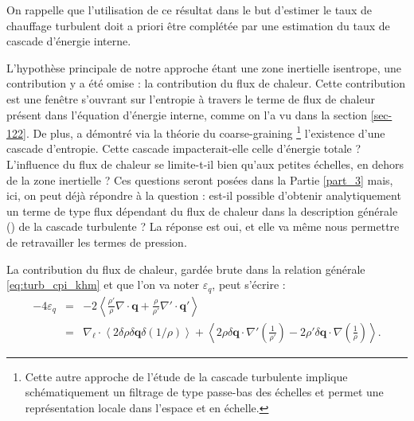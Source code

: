 On rappelle que l'utilisation de ce résultat dans le but d'estimer le taux de chauffage turbulent doit a priori être complétée par une estimation du taux de cascade d'énergie interne.

L'hypothèse principale de notre approche étant une zone inertielle isentrope, une contribution y a été omise : la contribution du flux de chaleur. Cette contribution est une fenêtre s'ouvrant sur l'entropie à travers le terme de flux de chaleur présent dans l'équation d'énergie interne, comme on l'a vu dans la section \ref{sec-122}. De plus, \cite{eyink_cascades_2018} a démontré via la théorie du \og coarse-graining \fg{}\footnote{Cette autre approche de l'étude de la cascade turbulente implique schématiquement un filtrage de type passe-bas des échelles et permet une représentation locale dans l'espace et en échelle.} l'existence d'une cascade d'entropie. Cette cascade impacterait-elle celle d'énergie totale ? L'influence du flux de chaleur se limite-t-il bien qu'aux petites échelles, en dehors de la zone inertielle ? Ces questions seront posées dans la Partie \ref{part_3} mais, ici, on peut déjà répondre à la question : est-il possible d'obtenir analytiquement un terme de type flux dépendant du flux de chaleur dans la description générale () de la cascade turbulente ? La réponse est oui, et elle va même nous permettre de retravailler les termes de pression. 

La contribution du flux de chaleur, gardée brute dans la relation  générale \eqref{eq:turb_cpi_khm} et que l'on va noter $\varepsilon_{q}$, peut s'écrire :
    \begin{eqnarray}
    \label{eq:turb_ref_q}    - 4\varepsilon_{q}  &=& - 2 \left<\frac{\rho'}{\rho} \nabla \cdot \boldsymbol{q} + \frac{\rho}{\rho'} \nabla' \cdot \boldsymbol{q'}\right>\nonumber\\
        &=&\nabla_{\boldsymbol{\ell}} \cdot \left<2\delta \rho \delta \boldsymbol{q}\delta \left(1/\rho\right) \right> + \left< 2\rho  \delta \boldsymbol{q} \cdot \nabla'\left(\frac{1}{\rho'}\right) -  2\rho' \delta \boldsymbol{q} \cdot \nabla \left(\frac{1}{\rho}\right)\right> .
    \end{eqnarray}

